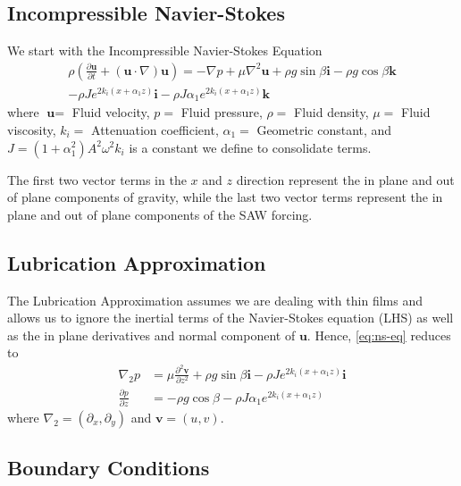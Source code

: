 \documentclass[compress, xcolor=dvipsnames]{beamer}
\newcommand{\vect}[1]{\ensuremath{\textbf{#1}}}
\newcommand{\vecu}{\textbf{u}}
\newcommand{\grad}{\ensuremath{\nabla}}
\newcommand{\pderiv}[2]{\ensuremath{\frac{\partial #1}{\partial #2}}}
\newcommand{\lrp}[1]{\left( #1 \right)}
\newcommand{\cexpz}{\ensuremath{e^{2k_i \lrp{x + \alpha_1 z}}}}
\begin{document}
    \subsection{Incompressible Navier-Stokes}
    \begin{frame}
        We start with the Incompressible Navier-Stokes Equation
        \begin{multline}
            \rho \lrp{\pderiv{\vecu}{t} + \lrp{\vecu \cdot \grad}\vecu} = -\grad p
            + \mu \grad^2 \vecu + \rho g \sin \beta \vect{i} - \rho g \cos \beta \vect{k} \\
            - \rho J e^{2k_i \lrp{x + \alpha_1 z}} \vect{i} - \rho J \alpha_1 e^{2k_i \lrp{x + \alpha_1 z}} \vect{k}
            \label{eq:ns-eq}
        \end{multline}
        where $\vect{u} =$ Fluid velocity, $p =$ Fluid pressure, $\rho =$ Fluid density, $\mu =$ Fluid viscosity, 
        $k_i =$  Attenuation coefficient, $\alpha_1 =$ Geometric constant, and $J = \lrp{1 + \alpha_1^2}A^2\omega^2 k_i$
        is a constant we define to consolidate terms. 

        The first two vector terms in the $x$ and $z$ direction represent the in plane and out of plane 
        components of gravity, while the last two vector terms represent the in plane and out of plane 
        components of the SAW forcing. 
    \end{frame}
    \subsection{Lubrication Approximation}
    \begin{frame}
        The Lubrication Approximation assumes we are dealing with thin films
        and allows us to ignore the inertial terms of the Navier-Stokes equation (LHS) as well as the in plane
        derivatives and normal component of $\vecu$. Hence, \cref{eq:ns-eq} reduces to 
        \begin{equation}
            \begin{aligned}
                \grad_2 p &= \mu \frac{\partial^2 \vect{v}}{\partial z^2} + \rho g \sin\beta \vect{i} - \rho J\cexpz\vect{i}\\
                \pderiv{p}{z} &= -\rho g \cos\beta - \rho J\alpha_1 \cexpz
            \end{aligned}
            \label{eq:lub_approx}
        \end{equation}
        where $\grad_2 = \lrp{\partial_x, \partial_y}$ and $\vect{v} = \lrp{u, v}$. 
    \end{frame}
    \subsection{Boundary Conditions}
    \begin{frame}

    \end{frame}
\end{document}
